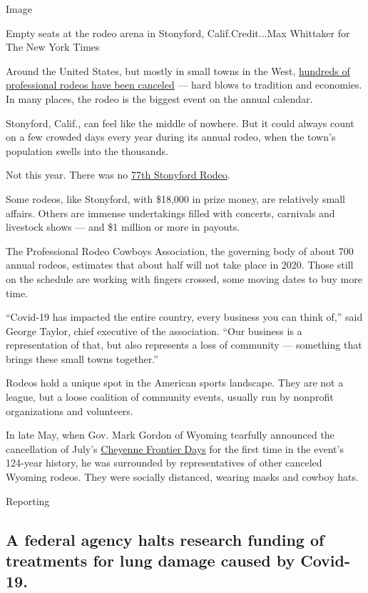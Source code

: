 Image

Empty seats at the rodeo arena in Stonyford, Calif.Credit...Max
Whittaker for The New York Times

Around the United States, but mostly in small towns in the West,
\href{https://www.nytimes.com/2020/06/19/us/coronavirus-rodeos.html}{hundreds
of professional rodeos have been canceled} --- hard blows to tradition
and economies. In many places, the rodeo is the biggest event on the
annual calendar.

Stonyford, Calif., can feel like the middle of nowhere. But it could
always count on a few crowded days every year during its annual rodeo,
when the town's population swells into the thousands.

Not this year. There was no
\href{https://www.stonycreekhorsemen.org/}{77th Stonyford Rodeo}.

Some rodeos, like Stonyford, with \$18,000 in prize money, are
relatively small affairs. Others are immense undertakings filled with
concerts, carnivals and livestock shows --- and \$1 million or more in
payouts.

The Professional Rodeo Cowboys Association, the governing body of about
700 annual rodeos, estimates that about half will not take place in
2020. Those still on the schedule are working with fingers crossed, some
moving dates to buy more time.

``Covid-19 has impacted the entire country, every business you can think
of,'' said George Taylor, chief executive of the association. ``Our
business is a representation of that, but also represents a loss of
community --- something that brings these small towns together.''

Rodeos hold a unique spot in the American sports landscape. They are not
a league, but a loose coalition of community events, usually run by
nonprofit organizations and volunteers.

In late May, when Gov. Mark Gordon of Wyoming tearfully announced the
cancellation of July's \href{https://www.cfdrodeo.com/}{Cheyenne
Frontier Days} for the first time in the event's 124-year history, he
was surrounded by representatives of other canceled Wyoming rodeos. They
were socially distanced, wearing masks and cowboy hats.

Reporting

\hypertarget{a-federal-agency-halts-research-funding-of-treatments-for-lung-damage-caused-by-covid-19}{%
\subsection{A federal agency halts research funding of treatments for
lung damage caused by
Covid-19.}\label{a-federal-agency-halts-research-funding-of-treatments-for-lung-damage-caused-by-covid-19}}

